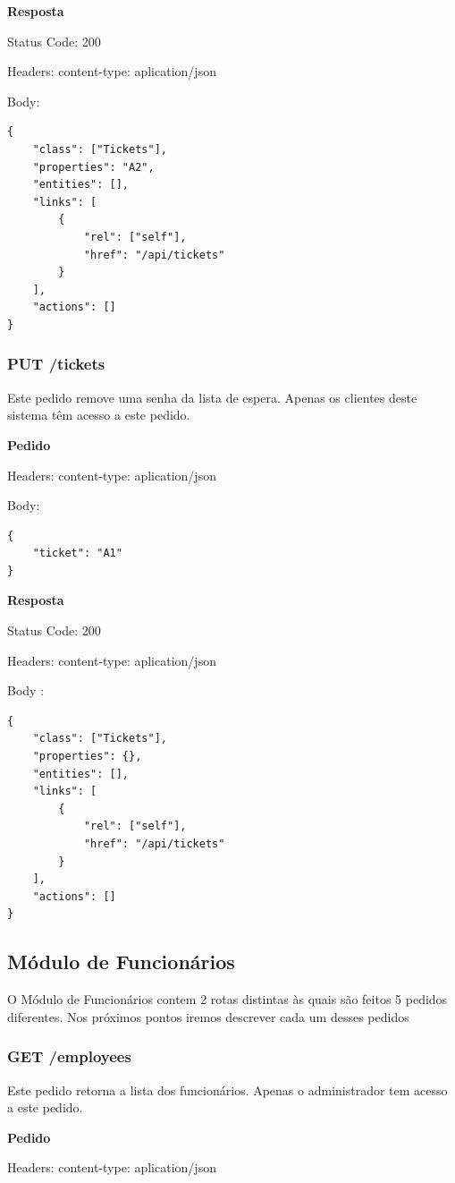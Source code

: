 \documentclass[12pt,a4paper]{article}
\begin{document}
 
\textbf{Resposta}\par
Status Code: 200\par 
Headers: content-type: aplication/json\par 
Body: 
\begin{verbatim}
{
    "class": ["Tickets"],
    "properties": "A2",
    "entities": [],
    "links": [         
        {
            "rel": ["self"],
            "href": "/api/tickets"
        }
    ],
    "actions": []
}
\end{verbatim}
\pagebreak
\subsubsection{PUT /tickets}
Este pedido remove uma senha da lista de espera. Apenas os clientes deste sistema têm acesso a este pedido.\par
\vspace{0.5 cm}
\textbf{Pedido}\par
Headers: content-type: aplication/json\par
Body:
\begin{verbatim}
{
    "ticket": "A1"
}
\end{verbatim}
    
\textbf{Resposta}\par
Status Code: 200\par 
Headers: content-type: aplication/json\par 
Body : 
\begin{verbatim}
{
    "class": ["Tickets"],
    "properties": {},
    "entities": [],
    "links": [
        {
            "rel": ["self"],
            "href": "/api/tickets"
        }     
    ],
    "actions": []
}
\end{verbatim}
\pagebreak
\subsection{Módulo de Funcionários}
O Módulo de Funcionários contem 2 rotas distintas às quais são feitos 5 pedidos diferentes. Nos próximos pontos 
iremos descrever cada um desses pedidos
\subsubsection{GET /employees}
Este pedido retorna a lista dos funcionários. Apenas o administrador tem acesso a este pedido.\par
\vspace{0.5 cm}
\textbf{Pedido}\par
Headers: content-type: aplication/json
\vspace{0.5 cm}
\end{document}
